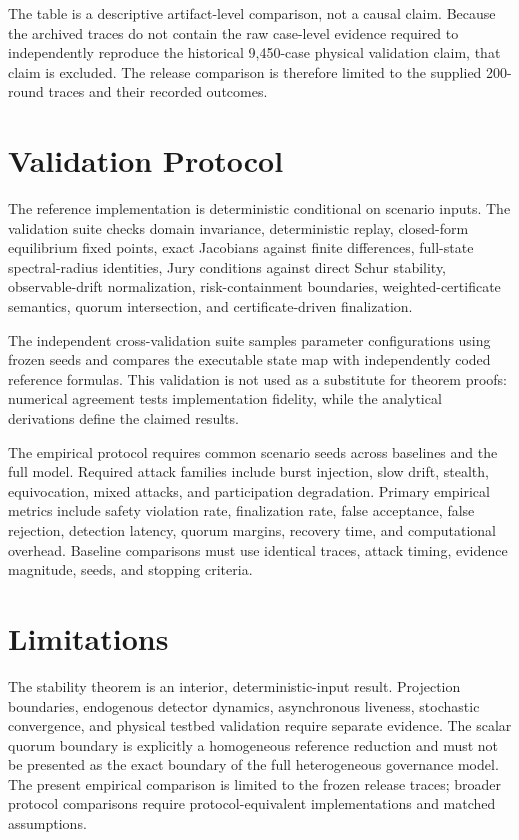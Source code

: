 \documentclass[10pt,journal]{IEEEtran}
\begin{document}


The table is a descriptive artifact-level comparison, not a causal claim. Because the archived traces do not contain the raw case-level evidence required to independently reproduce the historical 9,450-case physical validation claim, that claim is excluded. The release comparison is therefore limited to the supplied 200-round traces and their recorded outcomes.

\section{Validation Protocol}
The reference implementation is deterministic conditional on scenario inputs. The validation suite checks domain invariance, deterministic replay, closed-form equilibrium fixed points, exact Jacobians against finite differences, full-state spectral-radius identities, Jury conditions against direct Schur stability, observable-drift normalization, risk-containment boundaries, weighted-certificate semantics, quorum intersection, and certificate-driven finalization.

The independent cross-validation suite samples parameter configurations using frozen seeds and compares the executable state map with independently coded reference formulas. This validation is not used as a substitute for theorem proofs: numerical agreement tests implementation fidelity, while the analytical derivations define the claimed results.

The empirical protocol requires common scenario seeds across baselines and the full model. Required attack families include burst injection, slow drift, stealth, equivocation, mixed attacks, and participation degradation. Primary empirical metrics include safety violation rate, finalization rate, false acceptance, false rejection, detection latency, quorum margins, recovery time, and computational overhead. Baseline comparisons must use identical traces, attack timing, evidence magnitude, seeds, and stopping criteria.

\section{Limitations}
The stability theorem is an interior, deterministic-input result. Projection boundaries, endogenous detector dynamics, asynchronous liveness, stochastic convergence, and physical testbed validation require separate evidence. The scalar quorum boundary is explicitly a homogeneous reference reduction and must not be presented as the exact boundary of the full heterogeneous governance model. The present empirical comparison is limited to the frozen release traces; broader protocol comparisons require protocol-equivalent implementations and matched assumptions.
\end{document}
